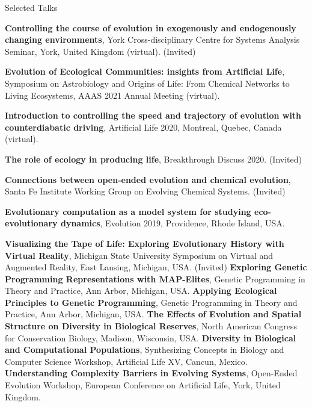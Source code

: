 \begin{rubric}{Selected Talks}

\entry*[2021] \textbf{Controlling the course of evolution in exogenously and endogenously changing environments}, York Cross-disciplinary Centre for Systems Analysis Seminar, York, United Kingdom (virtual). (Invited)

\entry*[2021] \textbf{Evolution of Ecological Communities: insights from Artificial Life}, Symposium on Astrobiology and Origins of Life: From Chemical Networks to Living Ecosystems, AAAS 2021 Annual Meeting (virtual).

\entry*[2020] \textbf{Introduction to controlling the speed and trajectory of evolution with counterdiabatic driving}, Artificial Life 2020, Montreal, Quebec, Canada (virtual).

\entry*[Postponed] \textbf{The role of ecology in producing life}, Breakthrough Discuss 2020. (Invited)

\entry*[2019] \textbf{Connections between open-ended evolution and chemical evolution}, Santa Fe Institute Working Group on Evolving Chemical Systems. (Invited)

\entry*[2019] \textbf{Evolutionary computation as a model system for studying eco-evolutionary dynamics}, Evolution 2019, Providence, Rhode Island, USA.

\entry*[2018] \textbf{Visualizing the Tape of Life: Exploring Evolutionary History with Virtual Reality}, Michigan State University Symposium on Virtual and Augmented Reality, East Lansing, Michigan, USA. (Invited)
%
\entry*[2018] \textbf{Exploring Genetic Programming Representations with MAP-Elites}, Genetic Programming in Theory and Practice, Ann Arbor, Michigan, USA.
%
\entry*[2017] \textbf{Applying Ecological Principles to Genetic Programming}, Genetic Programming in Theory and Practice, Ann Arbor, Michigan, USA.
%
\entry*[2016] \textbf{The Effects of Evolution and Spatial Structure on Diversity in Biological Reserves}, North American Congress for Conservation Biology, Madison, Wisconsin, USA. 
%
\entry*[2016] \textbf{Diversity in Biological and Computational Populations}, Synthesizing Concepts in Biology and Computer Science Workshop, Artificial Life XV, Cancun, Mexico. 
%
\entry*[2015] \textbf{Understanding Complexity Barriers in Evolving Systems}, Open-Ended Evolution Workshop, European Conference on Artificial Life, York, United Kingdom. 
%
%

\end{rubric}
